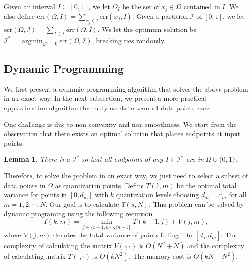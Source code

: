 \documentclass{article}
\newcommand{\err}{\ensuremath{\mathrm{err}}}
\newcommand{\setX}{\Omega}
\newcommand{\setI}{\mathcal{I}}
\DeclareMathOperator*{\argmin}{argmin}
\newtheorem{lemma}{Lemma}
\begin{document}
Given an interval $I \subseteq [0, 1]$, we let $\setX_I$ be the set of $x_j \in \setX$ contained in $I$.
We also define $\err (\setX, I) = \sum_{x_j \in I} \err (x_j, I)$.
Given a partition $\setI$ of $[0, 1]$, we let $\err (\setX, \setI) = \sum_{I \in \setI} \err (\setX, I)$.
We let the optimum solution be $\setI^* = \argmin_{|\setI| = k} \err (\setX, \setI)$, breaking ties randomly. 

\subsection{Dynamic Programming}

We first present a dynamic programming algorithm that solves the above problem in an exact way. In the next subsection, we present a more practical approximation algorithm that only needs to scan all data points \emph{once}.

One challenge is due to non-convexity and non-smoothness. 
We start from the observation that there exists an optimal solution that places endpoints at input points. 

\begin{lemma}
\label{lem:discrete}
There is a $\setI^*$ so that all endpoints of any $I \in \setI^*$ are in $\Omega \cup \{0, 1\}$.
\end{lemma}

Therefore, to solve the problem in an exact way, we just need to select a subset of data points in $\Omega$ as quantization points. Define $T(k, m)$ be the optimal total variance for points in $[0, d_m]$ with $k$ quantization levels choosing $d_m=x_m$ for all $m=1,2,\cdots, N$. Our goal is to calculate $T(s, N)$. This problem can be solved by dynamic programing using the following recursion
\[
T(k, m) = \min_{j\in \{k-1, k, \cdots, m-1\}} T(k-1,j) + V(j,m),
\]
where $V(j,m)$ denotes the total variance of points falling into $[d_j, d_m]$. The complexity of calculating the matrix $V(\cdot, \cdot)$ is $O(N^2 + N)$ and the complexity of calculating matrix $T(\cdot, \cdot)$ is $O(kN^2)$. The memory cost is $O(kN + N^2)$. 
\end{document}
